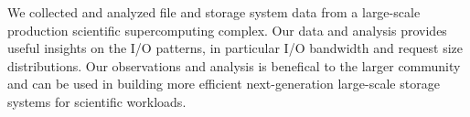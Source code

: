We collected and analyzed file and storage system data from a large-scale production scientific
supercomputing complex. Our data and analysis provides useful insights on the
I/O patterns, in particular I/O bandwidth and request size distributions. Our
observations and analysis is benefical to the larger community and can be used
in building more efficient next-generation large-scale storage systems for
scientific workloads.  
